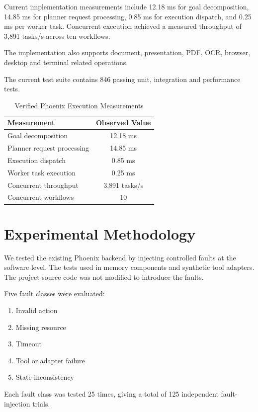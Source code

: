 \documentclass[conference]{IEEEtran}
\begin{document}
Current implementation measurements include 12.18 ms for goal decomposition, 14.85 ms for planner request processing, 0.85 ms for execution dispatch, and 0.25 ms per worker task. Concurrent execution achieved a measured throughput of 3,891 tasks/s across ten workflows.

The implementation also supports document, presentation, PDF, OCR, browser, desktop and terminal related operations.

The current test suite contains 846 passing unit, integration and performance tests.

\begin{table}[htbp]
\caption{Verified Phoenix Execution Measurements}
\label{tab:execution_measurements}
\centering
\begin{tabular}{p{4.5cm} c}
\toprule
\textbf{Measurement} & \textbf{Observed Value} \\
\midrule
Goal decomposition & 12.18 ms \\
Planner request processing & 14.85 ms \\
Execution dispatch & 0.85 ms \\
Worker task execution & 0.25 ms \\
Concurrent throughput & 3,891 tasks/s \\
Concurrent workflows & 10 \\
\bottomrule
\end{tabular}
\end{table}

\section{Experimental Methodology}
We tested the existing Phoenix backend by injecting controlled faults at the software level. The tests used in memory components and synthetic tool adapters. The project source code was not modified to introduce the faults.

Five fault classes were evaluated:
\begin{enumerate}
    \item Invalid action
    \item Missing resource
    \item Timeout
    \item Tool or adapter failure
    \item State inconsistency
\end{enumerate}

Each fault class was tested 25 times, giving a total of 125 independent fault-injection trials.
\end{document}
